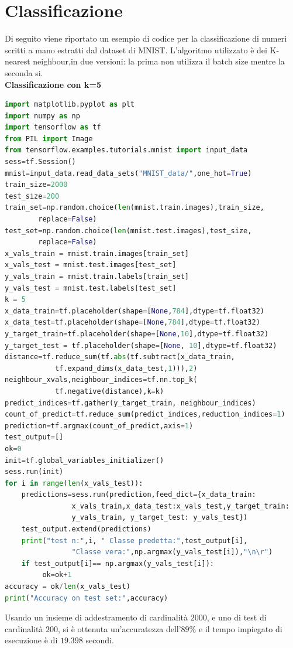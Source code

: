 \documentclass[a4paper,12pt,oneside]{book}
\begin{document}
\section*{Classificazione}
Di seguito viene riportato un esempio di codice per la classificazione di numeri scritti a mano estratti dal dataset di MNIST. L'algoritmo utilizzato \`{e} dei K-nearest neighbour,in due versioni: la prima non utilizza il batch size mentre la seconda si.\\
\textbf{Classificazione con k=5}
\begin{lstlisting}[language={Python},tabsize=2]
import matplotlib.pyplot as plt
import numpy as np
import tensorflow as tf
from PIL import Image
from tensorflow.examples.tutorials.mnist import input_data
sess=tf.Session()
mnist=input_data.read_data_sets("MNIST_data/",one_hot=True)
train_size=2000
test_size=200
train_set=np.random.choice(len(mnist.train.images),train_size,
		replace=False)
test_set=np.random.choice(len(mnist.test.images),test_size,
		replace=False)
x_vals_train = mnist.train.images[train_set]
x_vals_test = mnist.test.images[test_set]
y_vals_train = mnist.train.labels[train_set]
y_vals_test = mnist.test.labels[test_set]
k = 5
x_data_train=tf.placeholder(shape=[None,784],dtype=tf.float32)
x_data_test=tf.placeholder(shape=[None,784],dtype=tf.float32)
y_target_train=tf.placeholder(shape=[None,10],dtype=tf.float32)
y_target_test = tf.placeholder(shape=[None, 10],dtype=tf.float32)
distance=tf.reduce_sum(tf.abs(tf.subtract(x_data_train,
			tf.expand_dims(x_data_test,1))),2)
neighbour_xvals,neighbour_indices=tf.nn.top_k(
			tf.negative(distance),k=k)
predict_indices=tf.gather(y_target_train, neighbour_indices)
count_of_predict=tf.reduce_sum(predict_indices,reduction_indices=1)
prediction=tf.argmax(count_of_predict,axis=1)
test_output=[]
ok=0
init=tf.global_variables_initializer()
sess.run(init)
for i in range(len(x_vals_test)):
    predictions=sess.run(prediction,feed_dict={x_data_train:
				x_vals_train,x_data_test:x_vals_test,y_target_train:
				y_vals_train, y_target_test: y_vals_test})
    test_output.extend(predictions)
    print("test n:",i, " Classe predetta:",test_output[i],
				"Classe vera:",np.argmax(y_vals_test[i]),"\n\r")
    if test_output[i]== np.argmax(y_vals_test[i]):
         ok=ok+1
accuracy = ok/len(x_vals_test)
print("Accuracy on test set:",accuracy)
\end{lstlisting}
Usando un insieme di addestramento di cardinalit\`{a} $2000$, e uno di test di cardinalit\`{a} $200$, si \`{e} ottenuta un'accuratezza dell'$89\%$ e il tempo impiegato di esecuzione \`{e} di $19.398$ secondi.\\
\end{document}
